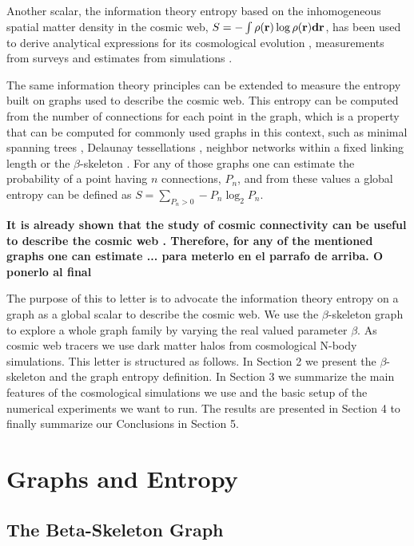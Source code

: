 \documentclass[fleqn,usenatbib]{mnras}
\begin{document}
Another scalar, the information theory entropy based on the inhomogeneous 
spatial matter density in the cosmic web,
$S=-\int\rho(\bf{r})\log\rho(\bf{r}) d\bf{r}$, has
been used to derive analytical expressions for its cosmological evolution
\citep{2004PhRvL..92n1302H}, measurements from surveys
\citep{2015MNRAS.454.2647P}
and estimates from simulations \citep{2020MNRAS.491.5447V}.

The same information theory principles can be extended to measure the entropy built 
on graphs  used to describe the cosmic web. 
This entropy can be computed from the number of connections for each point in the graph, 
which is a property that  can be computed for commonly used graphs in this context, such as  minimal spanning trees \citep{1985MNRAS.216...17B}, Delaunay tessellations \citep{2007MNRAS.382....2R}, neighbor networks within a fixed linking length \citep{2016MNRAS.459.2690H} or the $\beta$-skeleton \citep{2019MNRAS.485.5276F}. 
For any of those graphs one can estimate the probability of a point having $n$ connections, $P_n$, and from these values a global entropy can be defined as $S = \sum_{P_n>0}-P_n\log_2{P_n}$.


\textbf{It is already shown that the study of cosmic connectivity can be useful to describe the cosmic web \citep{10.1093/mnras/stz3535}.  Therefore, for any of the mentioned graphs one can estimate ... para meterlo en el parrafo de arriba. O ponerlo al final}

The purpose of this to letter is to advocate the information theory entropy on a graph
as a global scalar to describe the cosmic web.
We use the $\beta$-skeleton graph to explore a whole graph family 
by varying the real valued parameter $\beta$.
As cosmic web tracers we use dark matter halos from cosmological N-body simulations. 
This letter is structured as follows. 
In Section 2 we present the $\beta$-skeleton and the graph entropy definition.
In Section 3 we summarize the main features of the cosmological simulations we use and 
the basic setup of the numerical experiments we want to run.
The results are presented in Section 4 to finally summarize our Conclusions in Section 5.

\section{Graphs and Entropy}

\subsection{The Beta-Skeleton Graph}
\end{document}
